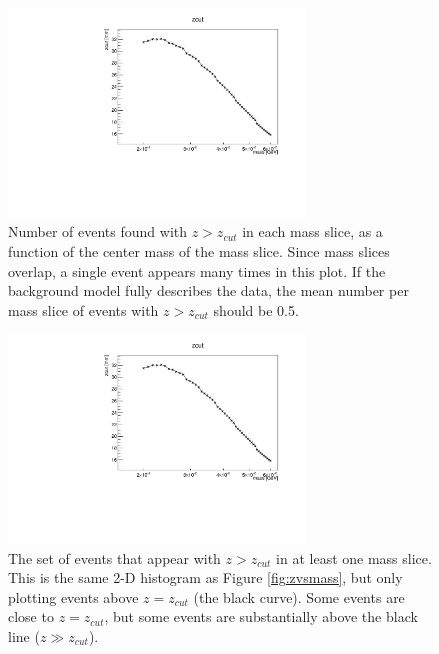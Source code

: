 \begin{figure}[ht]
\begin{center}
    \includegraphics[width=0.7\textwidth,page=8,angle=-90]{vertexing/figs/golden_mres_output}
\end{center}
\caption{Number of events found with $z>z_{cut}$ in each mass slice, as a function of the center mass of the mass slice.
Since mass slices overlap, a single event appears many times in this plot.
If the background model fully describes the data, the mean number per mass slice of events with $z>z_{cut}$ should be 0.5.}
    \label{fig:n_candidates}
\end{figure}

\begin{figure}[ht]
\begin{center}
    \includegraphics[width=0.7\textwidth,page=4,angle=-90]{vertexing/figs/golden_mres_output}
\end{center}
\caption{The set of events that appear with $z>z_{cut}$ in at least one mass slice.
This is the same 2-D histogram as Figure \ref{fig:zvsmass}, but only plotting events above $z=z_{cut}$ (the black curve).
Some events are close to $z=z_{cut}$, but some events are substantially above the black line ($z\gg z_{cut}$).}
    \label{fig:zvsmass_candidates}
\end{figure}

